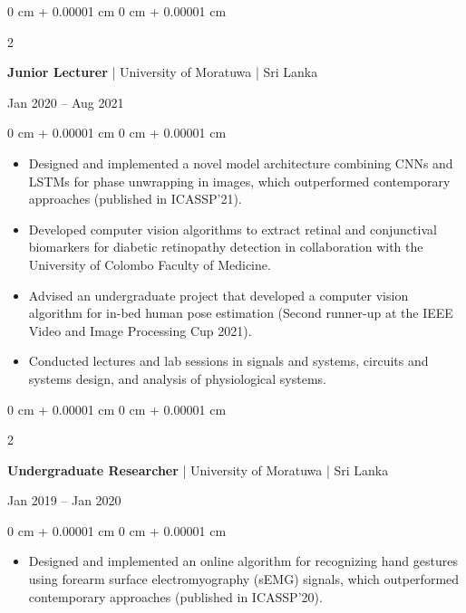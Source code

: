 \documentclass[10pt, letterpaper]{article}
\newenvironment{highlights}{
    \begin{itemize}[
        topsep=0.10 cm,
        parsep=0.10 cm,
        partopsep=0pt,
        itemsep=0pt,
        leftmargin=0 cm + 10pt
    ]
}{
    \end{itemize}
} %
\newenvironment{onecolentry}{
    \begin{adjustwidth}{
        0 cm + 0.00001 cm
    }{
        0 cm + 0.00001 cm
    }
}{
    \end{adjustwidth}
} %
\newenvironment{twocolentry}[2][]{
    \onecolentry
    \def\secondColumn{#2}
    \setcolumnwidth{\fill, 4.5 cm}
    \begin{paracol}{2}
}{
    \switchcolumn \raggedleft \secondColumn\strut
    \end{paracol}
    \endonecolentry
} %
\begin{document}
        \begin{twocolentry}{Jan 2020 – Aug 2021}
        \textbf{Junior Lecturer} | University of Moratuwa | Sri Lanka
        \end{twocolentry}
        \vspace{0.10 cm}
        \begin{onecolentry}
            \begin{highlights}
                \item Designed and implemented a novel model architecture combining CNNs and LSTMs for phase unwrapping in images, which outperformed contemporary approaches (published in ICASSP'21).
                \item Developed computer vision algorithms to extract retinal and conjunctival biomarkers for diabetic retinopathy detection in collaboration with the University of Colombo Faculty of Medicine.
                \item Advised an undergraduate project that developed a computer vision algorithm for in-bed human pose estimation (Second runner-up at the IEEE Video and Image Processing Cup 2021).
                \item Conducted lectures and lab sessions in signals and systems, circuits and systems design, and analysis of physiological systems.
            \end{highlights}
        \end{onecolentry}

        \vspace{0.2 cm}

        \begin{twocolentry}{Jan 2019 – Jan 2020}
        \textbf{Undergraduate Researcher} | University of Moratuwa | Sri Lanka
        \end{twocolentry}
        \vspace{0.10 cm}
        \begin{onecolentry}
            \begin{highlights}
                \item Designed and implemented an online algorithm for recognizing hand gestures using forearm surface electromyography (sEMG) signals, which outperformed contemporary approaches (published in ICASSP'20).
            \end{highlights}
        \end{onecolentry}
\end{document}
